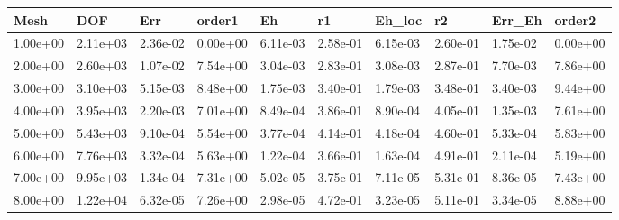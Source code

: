 \begin{tabular}{llllllllll}
Mesh & DOF & Err & order1 & Eh & r1 & Eh_loc & r2 & Err_Eh & order2 \\ 
\hline 
1.00e+00 & 2.11e+03 & 2.36e-02 & 0.00e+00 & 6.11e-03 & 2.58e-01 & 6.15e-03 & 2.60e-01 & 1.75e-02 & 0.00e+00 \\ 
2.00e+00 & 2.60e+03 & 1.07e-02 & 7.54e+00 & 3.04e-03 & 2.83e-01 & 3.08e-03 & 2.87e-01 & 7.70e-03 & 7.86e+00 \\ 
3.00e+00 & 3.10e+03 & 5.15e-03 & 8.48e+00 & 1.75e-03 & 3.40e-01 & 1.79e-03 & 3.48e-01 & 3.40e-03 & 9.44e+00 \\ 
4.00e+00 & 3.95e+03 & 2.20e-03 & 7.01e+00 & 8.49e-04 & 3.86e-01 & 8.90e-04 & 4.05e-01 & 1.35e-03 & 7.61e+00 \\ 
5.00e+00 & 5.43e+03 & 9.10e-04 & 5.54e+00 & 3.77e-04 & 4.14e-01 & 4.18e-04 & 4.60e-01 & 5.33e-04 & 5.83e+00 \\ 
6.00e+00 & 7.76e+03 & 3.32e-04 & 5.63e+00 & 1.22e-04 & 3.66e-01 & 1.63e-04 & 4.91e-01 & 2.11e-04 & 5.19e+00 \\ 
7.00e+00 & 9.95e+03 & 1.34e-04 & 7.31e+00 & 5.02e-05 & 3.75e-01 & 7.11e-05 & 5.31e-01 & 8.36e-05 & 7.43e+00 \\ 
8.00e+00 & 1.22e+04 & 6.32e-05 & 7.26e+00 & 2.98e-05 & 4.72e-01 & 3.23e-05 & 5.11e-01 & 3.34e-05 & 8.88e+00 \\ 
\hline 
\end{tabular}